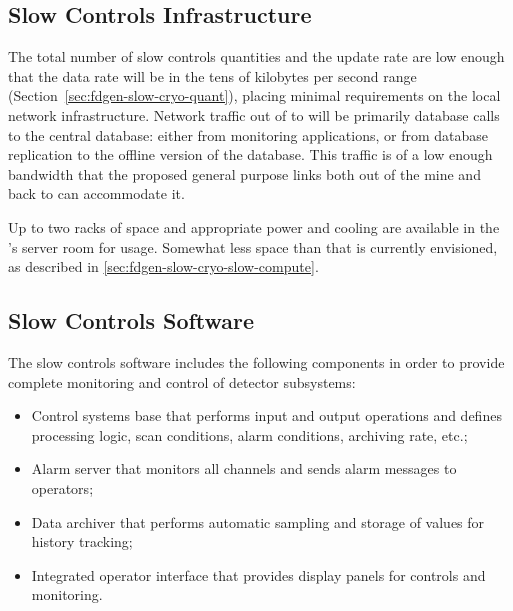 


\subsection{Slow Controls Infrastructure}
\label{sec:fdgen-slow-cryo-slow-infra}

The total number of slow controls quantities and the update rate are low enough
that the data rate will be in the tens of kilobytes per second range
(Section~\ref{sec:fdgen-slow-cryo-quant}), placing minimal requirements
on the local network infrastructure.
Network traffic out of \surf to \fnal will be primarily database calls
to the central  database: either from monitoring applications, or from
database replication to the offline version of the  database.  This
traffic is of a low enough bandwidth that the proposed general purpose
links both out of the mine and back to \fnal can accommodate it.

Up to two racks of space and appropriate power and cooling are
available in the 's  server room for  usage.
Somewhat less space than that is currently envisioned, as described in
\ref{sec:fdgen-slow-cryo-slow-compute}.

\subsection{Slow Controls Software}
\label{sec:fdgen-slow-cryo-sw}

The slow controls software includes the following components in order 
to provide complete monitoring and control of detector subsystems:
%
\begin{itemize}
 \item{Control systems base} that performs input and output operations
  and defines processing logic, scan conditions, alarm conditions,
  archiving rate, etc.;
 \item{Alarm server} that monitors all channels and sends alarm
  messages to operators; 
 \item{Data archiver} that performs automatic sampling and storage of
  values for history tracking;
 \item{Integrated operator interface} that provides display panels for
  controls and monitoring.
\end{itemize}

